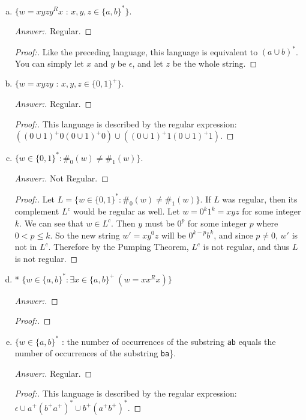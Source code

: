 \documentclass[10pt]{article}
\begin{document}
\begin{enumerate}[1)]
\begin{enumerate}[a)]
\item
$\{w = xyzy^Rx$ : $x, y, z \in \{a, b\}^*\}$.
\begin{proof}[Answer:]
Regular.
\end{proof}
\begin{proof}[Proof:]
Like the preceding language, this language is equivalent to $(a \cup b)^*$.  You can simply let $x$ and $y$ be $\epsilon$, and let $z$ be the whole string.
\end{proof}

\item
$\{w = xyzy$ : $x, y, z \in \{0, 1\}^+\}$.
\begin{proof}[Answer:]
Regular.
\end{proof}
\begin{proof}[Proof:]
This language is described by the regular expression: $((0 \cup 1)^+0(0 \cup 1)^+0) \cup ((0 \cup 1)^+1(0 \cup 1)^+1)$.

\end{proof}

\item
$\{w \in \{0, 1\}^* : \#_0(w) \neq \#_1(w)\}$.
\begin{proof}[Answer:]
Not Regular.
\end{proof}
\begin{proof}[Proof:]
Let $L = \{w \in \{0, 1\}^* : \#_0(w) \neq \#_1(w)\}$.  If $L$ was regular, then its complement $L^c$ would be regular as well.  Let $w = 0^k1^k = xyz$ for some integer $k$.  We can see that $w \in L^c$.  Then $y$ must be $0^p$ for some integer $p$ where $0 < p \leq k$.  So the new string $w' = xy^0z$ will be $0^{k-p}b^k$, and since $p \neq 0$, $w'$ is not in $L^c$.  Therefore by the Pumping Theorem, $L^c$ is not regular, and thus $L$ is not regular.
\end{proof}

\pagebreak
\item
* $\{w \in \{a, b\}^* : \exists x \in \{a, b\}^+\ (w = xx^Rx)\}$
\begin{proof}[Answer:]
\end{proof}
\begin{proof}[Proof:]
\end{proof}

\item
$\{w \in \{a, b\}^*$ : the number of occurrences of the substring \texttt{ab} equals the number of occurrences of the substring \texttt{ba}\}.
\begin{proof}[Answer:]
Regular.
\end{proof}
\begin{proof}[Proof:]
This language is described by the regular expression: $\epsilon \cup a^+(b^+a^+)^* \cup b^+(a^+b^+)^*$.
\end{proof}


\end{enumerate}
\end{enumerate}
\end{document}
